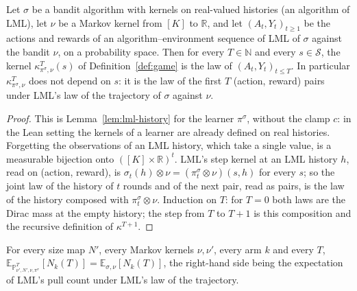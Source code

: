 \documentclass[11pt]{article}
\newcommand{\E}{\mathbb{E}}
\begin{document}
\begin{lemma}\label{flem:online-ofAlgorithm}
Let $\sigma$ be a bandit algorithm with kernels on real-valued histories (an algorithm of LML), let
$\nu$ be a Markov kernel from $[K]$ to $\mathbb R$, and let $(A_t,Y_t)_{t\ge1}$ be the actions and
rewards of an algorithm--environment sequence of LML of $\sigma$ against the bandit $\nu$, on a
probability space. Then for every $T\in\mathbb N$ and every $s\in\mathcal S$, the kernel
$\kappa^T_{\pi^\sigma,\nu}(s)$ of Definition~\ref{def:game} is the law of $(A_t,Y_t)_{t\le T}$. In
particular $\kappa^T_{\pi^\sigma,\nu}$ does not depend on $s$: it is the law of the first $T$
(action, reward) pairs under LML's law of the trajectory of $\sigma$ against $\nu$.
\end{lemma}

\begin{proof}
This is Lemma~\ref{lem:lml-history} for the learner $\pi^\sigma$, without the clamp $c$: in the
Lean setting the kernels of a learner are already defined on real histories. Forgetting the
observations of an LML history, which take a single value, is a measurable bijection onto
$([K]\times\mathbb R)^t$. LML's step kernel at an LML history $h$, read on (action, reward), is
$\sigma_t(h)\otimes\nu=(\pi^\sigma_t\otimes\nu)(s,h)$ for every $s$; so the joint law of the
history of $t$ rounds and of the next pair, read as pairs, is the law of the history composed with
$\pi^\sigma_t\otimes\nu$. Induction on $T$: for $T=0$ both laws are the Dirac mass at the empty
history; the step from $T$ to $T+1$ is this composition and the recursive definition of
$\kappa^{T+1}$.
\end{proof}

\begin{lemma}\label{flem:pulls-ofAlgorithm}
For every size map $N'$, every Markov kernels $\nu,\nu'$, every arm $k$ and every $T$,
$\E_{\mathbb P^T_{\nu',N',\nu,\pi^\sigma}}[N_k(T)]=\E_{\sigma,\nu}[N_k(T)]$, the right-hand side
being the expectation of LML's pull count under LML's law of the trajectory.
\end{lemma}
\end{document}
